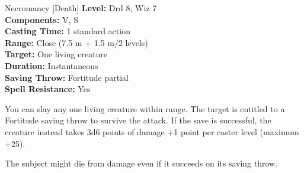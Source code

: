 {Necromancy [Death]}
{
	\textbf{Level:}
	Drd 8, Wiz 7\\
	\textbf{Components:}
	V, S\\
	\textbf{Casting Time:}
	1 standard action\\
	\textbf{Range:}
	Close (7.5 m + 1.5 m/2 levels)\\
	\textbf{Target:}
	One living creature\\
	\textbf{Duration:}
	Instantaneous\\
	\textbf{Saving Throw:}
	Fortitude partial\\
	\textbf{Spell Resistance:}
	Yes\\
}
{
	You can slay any one living creature within range. The target is entitled to a Fortitude saving throw to survive the attack. If the save is successful, the creature instead takes 3d6 points of damage +1 point per caster level (maximum +25).

	The subject might die from damage even if it succeeds on its saving throw.

}

